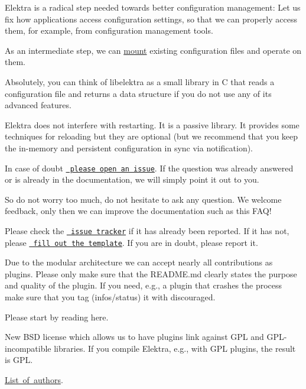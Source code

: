 Elektra is a radical step needed towards better configuration management\+: Let us fix how applications access configuration settings, so that we can properly access them, for example, from configuration management tools.

As an intermediate step, we can \mbox{\hyperlink{doc_help_elektra-mounting_md}{mount}} existing configuration files and operate on them.

Absolutely, you can think of libelektra as a small library in C that reads a configuration file and returns a data structure if you do not use any of its advanced features.

Elektra does not interfere with restarting. It is a passive library. It provides some techniques for reloading but they are optional (but we recommend that you keep the in-\/memory and persistent configuration in sync via notification).

In case of doubt \href{https://git.libelektra.org/issues}{\texttt{ please open an issue}}. If the question was already answered or is already in the documentation, we will simply point it out to you.

So do not worry too much, do not hesitate to ask any question. We welcome feedback, only then we can improve the documentation such as this F\+A\+Q!

Please check the \href{https://git.libelektra.org/issues}{\texttt{ issue tracker}} if it has already been reported. If it has not, please \href{https://git.libelektra.org/issues/new}{\texttt{ fill out the template}}. If you are in doubt, please report it.

Due to the modular architecture we can accept nearly all contributions as plugins. Please only make sure that the R\+E\+A\+D\+M\+E.\+md clearly states the purpose and quality of the plugin. If you need, e.\+g., a plugin that crashes the process make sure that you tag ({\ttfamily infos/status}) it with {\ttfamily discouraged}.

Please start by reading here.

New B\+SD license which allows us to have plugins link against G\+PL and G\+P\+L-\/incompatible libraries. If you compile Elektra, e.\+g., with G\+PL plugins, the result is G\+PL.

\mbox{\hyperlink{doc_AUTHORS_md}{List of authors}}.


